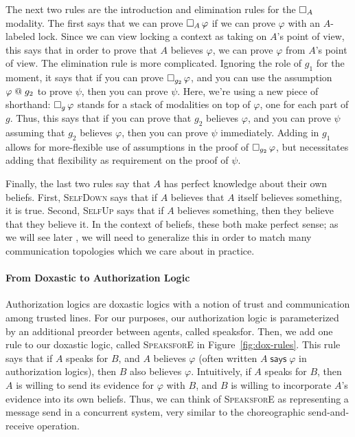 The next two rules are the introduction and elimination rules for the $\mathop{\square_{A}} $ modality.
The first says that we can prove $\mathop{\square_{A}} \varphi$ if we can prove $\varphi$ with an $A$-labeled lock.
Since we can view locking a context as taking on $A$'s point of view, this says that in order to prove that $A$ believes $\varphi$, we can prove $\varphi$ from $A$'s point of view.
The elimination rule is more complicated.
Ignoring the role of $g_1$ for the moment, it says that if you can prove $\mathop{\square_{g_2}} \varphi$, and you can use the assumption $\varphi \mathrel{@} g_2$ to prove $\psi$, then you can prove $\psi$.
Here, we're using a new piece of shorthand: $\mathop{\square_{g}} \varphi$ stands for a stack of modalities on top of $\varphi$, one for each part of $g$.
Thus, this says that if you can prove that $g_2$ believes $\varphi$, and you can prove $\psi$ assuming that $g_2$ believes $\varphi$, then you can prove $\psi$ immediately.
Adding in $g_1$ allows for more-flexible use of assumptions in the proof of $\mathop{\square_{g_2}} \varphi$, but necessitates adding that flexibility as requirement on the proof of $\psi$.

Finally, the last two rules say that $A$ has perfect knowledge about their own beliefs.
First, \textsc{SelfDown} says that if $A$ believes that $A$ itself believes something, it is true.
Second, \textsc{SelfUp} says that if $A$ believes something, then they believe that they believe it.
In the context of beliefs, these both make perfect sense; as we will see later , we will need to generalize this in order to match many communication topologies which we care about in practice.

\paragraph{From Doxastic to Authorization Logic}
Authorization logics are doxastic logics with a notion of trust and communication among trusted lines.
For our purposes, our authorization logic is parameterized by an additional preorder between agents, called \textsf{speaksfor}.
Then, we add one rule to our doxastic logic, called \textsc{SpeaksforE} in Figure~\ref{fig:dox-rules}.
This rule says that if $A$ speaks for $B$, and $A$ believes $\varphi$ (often written $A \mathrel{\textsf{says}} \varphi$ in authorization logics), then $B$ also believes $\varphi$.
Intuitively, if $A$ speaks for $B$, then $A$ is willing to send its evidence for $\varphi$ with $B$, and $B$ is willing to incorporate $A$'s evidence into its own beliefs.
Thus, we can think of \textsc{SpeaksforE} as representing a message send in a concurrent system, very similar to the choreographic send-and-receive operation.


